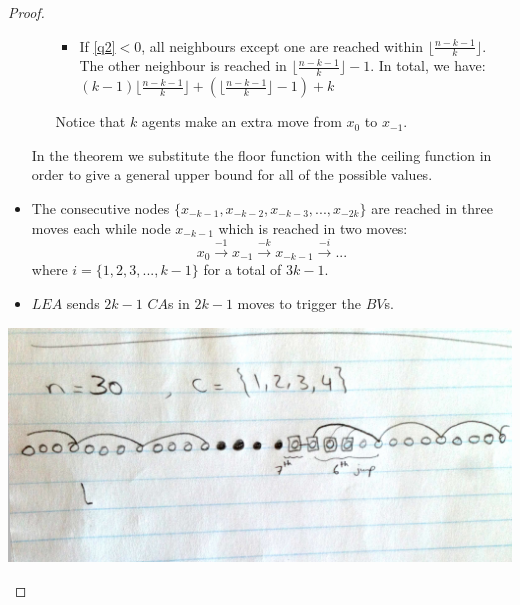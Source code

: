 \begin{proof}
\begin{itemize}
\begin{enumerate}
\begin{itemize}
\item If \ref{q2}$< 0 $, all neighbours except one are reached within $\lfloor \frac {n-k-1}{k} \rfloor $. The other neighbour is reached in $\lfloor \frac {n-k-1}{k} \rfloor -1$. In total, we have: \\
$(k-1)\lfloor \frac {n-k-1}{k} \rfloor + (\lfloor \frac {n-k-1}{k} \rfloor -1)+k$


\end {itemize}
Notice that $k$ agents make an extra move from $x_{0}$ to $x_{-1}$.
\end{enumerate}
In the theorem we substitute the floor function with the ceiling function in order to give a general upper bound for all of the possible values.
\item The consecutive nodes $\{x_{-k-1},x_{-k-2},x_{-k-3},...,x_{-2k}\}$   are reached in three moves each while node $x_{-k-1}$ which is reached in two moves:
$$x_{0} \xrightarrow {-1} x_{-1} \xrightarrow {-k}  x_{-k-1} \xrightarrow {-i} ...$$ 
where $i=\{1,2,3,...,k-1\}$ for a total of $3k-1$.

\item $LEA$ sends $2k-1$ $CA$s in $2k-1$ moves to trigger the $BV$s.

\end{itemize}
\begin {center}
\includegraphics [scale=0.50] {consecutive.jpg}
\end {center}
\end{proof}




